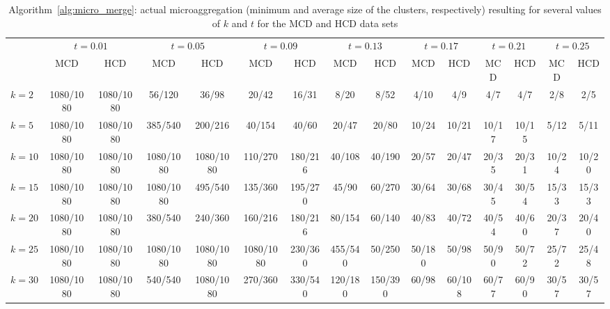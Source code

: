 \documentclass[10pt,journal,compsoc]{IEEEtran}
\theoremstyle{definition}
\theoremstyle{plain}
\begin{document}
\begin{table*}
\caption{\label{tab:micro-merge}Algorithm~\ref{alg:micro_merge}: actual microaggregation (minimum and average
size of the clusters, respectively) resulting for several values of $k$ and $t$ for the MCD and HCD data sets}
\centering
\scriptsize
\begin{tabular}{|l|cc|cc|cc|cc|cc|cc|cc|}\hline
 & \multicolumn{2}{c|}{$t=0.01$} & \multicolumn{2}{c|}{$t=0.05$} & \multicolumn{2}{c|}{$t=0.09$} & \multicolumn{2}{c|}{$t=0.13$} & \multicolumn{2}{c|}{$t=0.17$} & \multicolumn{2}{c|}{$t=0.21$} & \multicolumn{2}{c|}{$t=0.25$}\\
& MCD & HCD & MCD & HCD & MCD & HCD & MCD & HCD & MCD & HCD & MCD & HCD & MCD & HCD\\
\hline
$k=2$ & 1080/1080 & 1080/1080  & 56/120 & 36/98  & 20/42 & 16/31 & 8/20 & 8/52 & 4/10 & 4/9 & 4/7 & 4/7 & 2/8 & 2/5 \\
$k=5$ & 1080/1080 & 1080/1080  & 385/540 & 200/216  & 40/154 & 40/60 & 20/47 & 20/80 & 10/24 & 10/21 & 10/17 & 10/15 & 5/12 & 5/11 \\
$k=10$ & 1080/1080 & 1080/1080  & 1080/1080 & 1080/1080  & 110/270 & 180/216 & 40/108 & 40/190 & 20/57 & 20/47 & 20/35 & 20/31 & 10/24 & 10/20 \\
$k=15$ & 1080/1080 & 1080/1080  & 1080/1080 & 495/540  & 135/360 & 195/270 & 45/90 & 60/270 & 30/64 & 30/68 & 30/45 & 30/54 & 15/33 & 15/33 \\
$k=20$ & 1080/1080 & 1080/1080  & 380/540 & 240/360  & 160/216 & 180/216 & 80/154 & 60/140 & 40/83 & 40/72 & 40/54 & 40/60 & 20/37 & 20/40 \\
$k=25$ & 1080/1080 & 1080/1080  & 1080/1080 & 1080/1080  & 1080/1080 & 230/360 & 455/540 & 50/250 & 50/180 & 50/98 & 50/90 & 50/72 & 25/72 & 25/48 \\
$k=30$ & 1080/1080 & 1080/1080  & 540/540 & 1080/1080  & 270/360 & 330/540 & 120/180 & 150/390 & 60/98 & 60/108 & 60/77 & 60/90 & 30/57 & 30/57 \\
\hline
\end{tabular}
\end{table*} 
\end{document}
